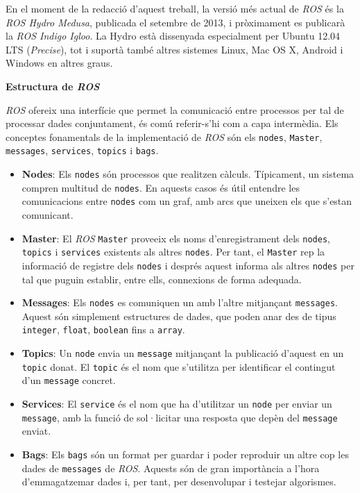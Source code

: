 \documentclass[12pt,a4paper,final,twoside]{article}
\begin{document}
En el moment de la redacció d'aquest treball, la versió més actual de \textit{ROS} és la \textit{ROS Hydro Medusa}, publicada el setembre de 2013, i pròximament es publicarà la \textit{ROS Indigo Igloo}. La Hydro està dissenyada especialment per Ubuntu 12.04 LTS (\textit{Precise}), tot i suportà també altres sistemes Linux, Mac OS X, Android i Windows en altres graus.


\vspace{20pt}
\textbf{Estructura de \textit{ROS}}

\textit{ROS} ofereix una interfície que permet la comunicació entre processos per tal de processar dades conjuntament, és comú referir-s'hi com a capa intermèdia. Els conceptes fonamentals de la implementació de \textit{ROS} són els \texttt{nodes}, \texttt{Master}, \texttt{messages}, \texttt{services}, \texttt{topics} i \texttt{bags}.

\begin{itemize}
\item \textbf{Nodes}: Els \texttt{nodes} són processos que realitzen càlculs. Típicament, un sistema compren multitud de \texttt{nodes}. En aquests casos és útil entendre les comunicacions entre \texttt{nodes} com un graf, amb arcs que uneixen els que s'estan comunicant.

\item \textbf{Master}: El \textit{ROS} \texttt{Master} proveeix els noms d'enregistrament dels \texttt{nodes}, \texttt{topics} i \texttt{services} existents als altres \texttt{nodes}. Per tant, el \texttt{Master} rep la informació de registre dels \texttt{nodes} i després aquest informa als altres \texttt{nodes} per tal que puguin establir, entre ells, connexions de forma adequada. 

\item \textbf{Messages}: Els \texttt{nodes} es comuniquen un amb l'altre mitjançant \texttt{messages}. Aquest són simplement estructures de dades, que poden anar des de tipus \texttt{integer}, \texttt{float}, \texttt{boolean} fins a \texttt{array}.

\item \textbf{Topics}: Un \texttt{node} envia un \texttt{message} mitjançant la publicació d'aquest en un \texttt{topic} donat. El \texttt{topic} és el nom que s'utilitza per identificar el contingut d'un \texttt{message} concret. 

\item \textbf{Services}: El \texttt{service} és el nom que ha d'utilitzar un \texttt{node} per enviar un \texttt{message}, amb la funció de sol·licitar una resposta que depèn del \texttt{message} enviat.

\item \textbf{Bags}: Els \texttt{bags} són un format per guardar i poder reproduir un altre cop les dades de \texttt{messages} de \textit{ROS}. Aquests són de gran importància a l'hora d'emmagatzemar dades i, per tant, per desenvolupar i testejar algorismes.
\end{itemize}
\end{document}
